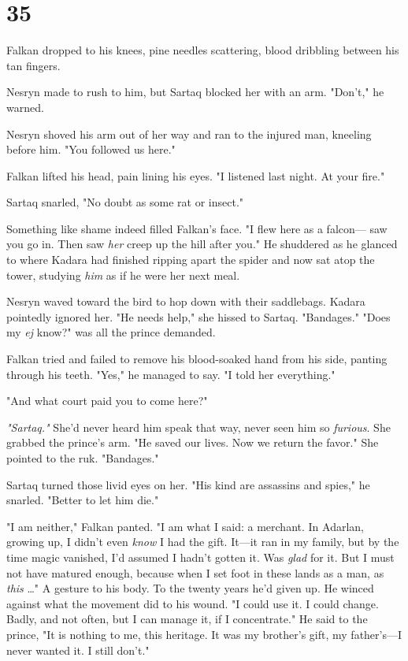 
\chapter{35}

Falkan dropped to his knees, pine needles scattering, blood dribbling between his tan fingers.

Nesryn made to rush to him, but Sartaq blocked her with an arm.
"Don't," he warned.

Nesryn shoved his arm out of her way and ran to the injured man, kneeling before him.
"You followed us here."

Falkan lifted his head, pain lining his eyes.
"I listened last night.
At your fire."

Sartaq snarled, "No doubt as some rat or insect."

Something like shame indeed filled Falkan's face.
"I flew here as a falcon--- saw you go in.
Then saw \emph{her} creep up the hill after you."
He shuddered as he glanced to where Kadara had finished ripping apart the spider and now sat atop the tower, studying \emph{him} as if he were her next meal.

Nesryn waved toward the bird to hop down with their saddlebags.
Kadara pointedly ignored her.
"He needs help," she hissed to Sartaq.
"Bandages."
"Does my \emph{ej} know?"
was all the prince demanded.

Falkan tried and failed to remove his blood-soaked hand from his side, panting through his teeth.
"Yes," he managed to say.
"I told her everything."

"And what court paid you to come here?"

\emph{"Sartaq."} She'd never heard him speak that way, never seen him so \emph{furious}.
She grabbed the prince's arm.
"He saved our lives.
Now we return the favor."
She pointed to the ruk.
"Bandages."

Sartaq turned those livid eyes on her.
"His kind are assassins and spies," he snarled.
"Better to let him die."

"I am neither," Falkan panted.
"I am what I said: a merchant.
In Adarlan, growing up, I didn't even \emph{know} I had the gift.
It---it ran in my family, but by the time magic vanished, I'd assumed I hadn't gotten it.
Was \emph{glad} for it.
But I must not have matured enough, because when I set foot in these lands as a man, as \emph{this} \ldots" A gesture to his body.
To the twenty years he'd given up.
He winced against what the movement did to his wound.
"I could use it.
I could change.
Badly, and not often, but I can manage it, if I concentrate."
He said to the prince, "It is nothing to me, this heritage.
It was my brother's gift, my father's---I never wanted it.
I still don't."

